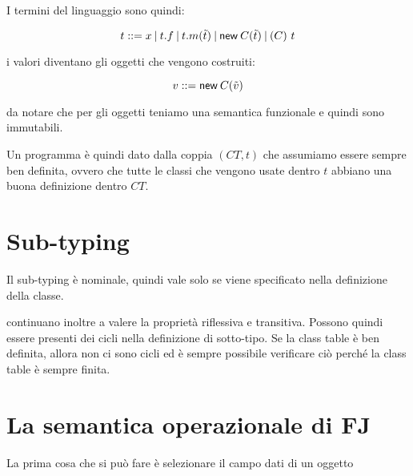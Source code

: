 \noindent I termini del linguaggio sono quindi:

$$
t ::= x \vbar t.f \vbar t.m(\tilde{t}) \vbar \new{C}{\tilde{t}} \vbar (C) \ t
$$

\noindent i valori diventano gli oggetti che vengono costruiti:

$$
v ::= \new{C}{\tilde{v}}
$$

\noindent da notare che per gli oggetti teniamo una semantica funzionale e quindi sono immutabili.

Un programma è quindi dato dalla coppia $(CT, t)$ che assumiamo essere sempre ben definita, ovvero che tutte le classi che vengono usate dentro $t$ abbiano una buona definizione dentro $CT$.

\section{Sub-typing}

Il sub-typing è nominale, quindi vale solo se viene specificato nella definizione della classe.

\begin{prooftree}
\end{prooftree}

\noindent continuano inoltre a valere la proprietà riflessiva e transitiva.
Possono quindi essere presenti dei cicli nella definizione di sotto-tipo. Se la class table è ben definita, allora non ci sono cicli ed è sempre possibile verificare ciò perché la class table è sempre finita.


\section{La semantica operazionale di FJ}

La prima cosa che si può fare è selezionare il campo dati di un oggetto

\begin{center}
\begin{bprooftree}
\end{bprooftree}
\begin{bprooftree}
\end{bprooftree}
\end{center}

